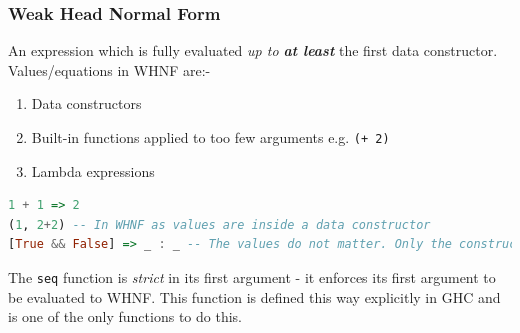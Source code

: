 \subsubsection{Weak Head Normal Form}
An expression which is fully evaluated \textit{up to \textbf{at least}} the first data constructor. Values/equations in WHNF are:-
\begin{enumerate}
  \item Data constructors
  \item Built-in functions applied to too few arguments e.g. \texttt{(+ 2)}
  \item Lambda expressions
\end{enumerate}

\begin{lstlisting}[language=haskell]
1 + 1 => 2
(1, 2+2) -- In WHNF as values are inside a data constructor
[True && False] => _ : _ -- The values do not matter. Only the constructor '(:)' matters in WHNF.
\end{lstlisting}

The \texttt{seq} function is \textit{strict} in its first argument - it enforces its first argument to be evaluated to WHNF. This function is defined this way explicitly in GHC and is one of the only functions to do this.